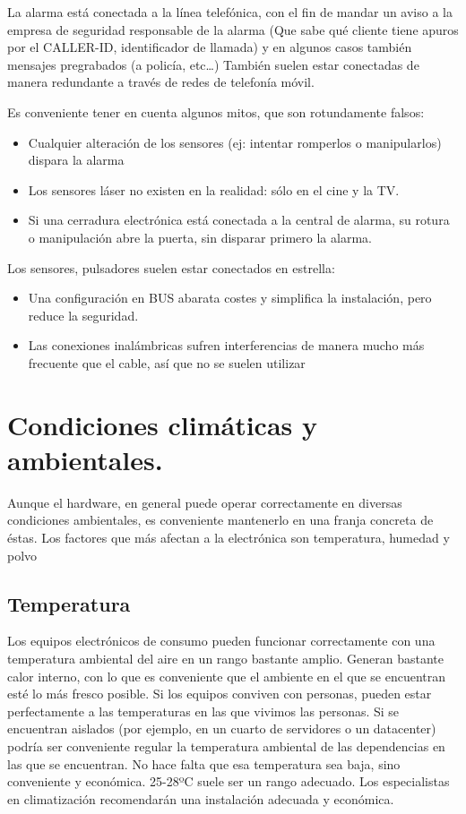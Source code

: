 \documentclass[a4paper]{article}
\begin{document}
La alarma está conectada a la línea telefónica, con el fin de mandar un aviso a la empresa de seguridad responsable de la alarma (Que sabe qué cliente tiene apuros por el CALLER-ID, identificador de llamada) y en algunos casos también mensajes pregrabados (a policía, etc…) También suelen estar conectadas de manera redundante a través de redes de telefonía móvil.

Es conveniente tener en cuenta algunos mitos, que son rotundamente falsos:
\begin{itemize}
\item Cualquier alteración de los sensores (ej: intentar romperlos o manipularlos) dispara la alarma
\item Los sensores láser no existen en la realidad: sólo en el cine y la TV.
\item Si una cerradura electrónica está conectada a la central de alarma, su rotura o manipulación abre la puerta, sin disparar primero la alarma.
\end{itemize}

Los sensores, pulsadores suelen estar conectados en estrella:
\begin{itemize}
\item Una configuración en BUS abarata costes y simplifica la instalación, pero reduce la seguridad.
\item Las conexiones inalámbricas sufren interferencias de manera mucho más frecuente que el cable, así que no se suelen utilizar
\end{itemize}
\section{Condiciones climáticas y ambientales.}
\label{sec:org0000039}
Aunque el hardware, en general puede operar correctamente en diversas condiciones ambientales, es conveniente mantenerlo en una franja concreta de éstas.
Los factores que más afectan a la electrónica son temperatura, humedad y polvo
\subsection{Temperatura}
\label{sec:org0000018}
Los equipos electrónicos  de consumo pueden funcionar correctamente con una temperatura ambiental del aire en un rango bastante amplio.
Generan bastante calor interno, con lo que es conveniente que el ambiente en el que se encuentran esté lo más fresco posible.
Si los equipos conviven con personas, pueden estar perfectamente a las temperaturas en las que vivimos las personas.
Si se encuentran aislados (por ejemplo, en un cuarto de servidores o un datacenter) podría ser conveniente regular la temperatura ambiental de las dependencias en las que se encuentran. No hace falta que esa temperatura sea baja, sino conveniente y económica. 25-28ºC suele ser un rango adecuado. Los especialistas en climatización recomendarán una instalación adecuada y económica.
\end{document}
